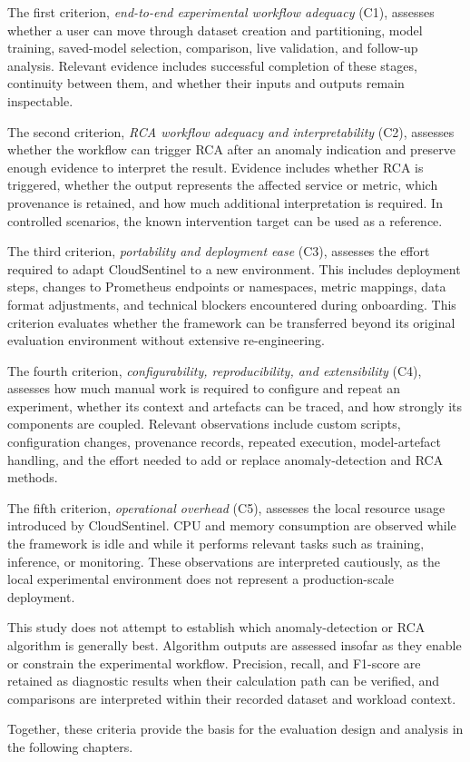 The first criterion, \textit{end-to-end experimental workflow adequacy} (C1), assesses whether a user can move through dataset creation and partitioning, model training, saved-model selection, comparison, live validation, and follow-up analysis. Relevant evidence includes successful completion of these stages, continuity between them, and whether their inputs and outputs remain inspectable.

The second criterion, \textit{RCA workflow adequacy and interpretability} (C2), assesses whether the workflow can trigger RCA after an anomaly indication and preserve enough evidence to interpret the result. Evidence includes whether RCA is triggered, whether the output represents the affected service or metric, which provenance is retained, and how much additional interpretation is required. In controlled scenarios, the known intervention target can be used as a reference.

The third criterion, \textit{portability and deployment ease} (C3), assesses the effort required to adapt CloudSentinel to a new environment. This includes deployment steps, changes to Prometheus endpoints or namespaces, metric mappings, data format adjustments, and technical blockers encountered during onboarding. This criterion evaluates whether the framework can be transferred beyond its original evaluation environment without extensive re-engineering.

The fourth criterion, \textit{configurability, reproducibility, and extensibility} (C4), assesses how much manual work is required to configure and repeat an experiment, whether its context and artefacts can be traced, and how strongly its components are coupled. Relevant observations include custom scripts, configuration changes, provenance records, repeated execution, model-artefact handling, and the effort needed to add or replace anomaly-detection and RCA methods.

The fifth criterion, \textit{operational overhead} (C5), assesses the local resource usage introduced by CloudSentinel. CPU and memory consumption are observed while the framework is idle and while it performs relevant tasks such as training, inference, or monitoring. These observations are interpreted cautiously, as the local experimental environment does not represent a production-scale deployment.

This study does not attempt to establish which anomaly-detection or RCA algorithm is generally best. Algorithm outputs are assessed insofar as they enable or constrain the experimental workflow. Precision, recall, and F1-score are retained as diagnostic results when their calculation path can be verified, and comparisons are interpreted within their recorded dataset and workload context.

Together, these criteria provide the basis for the evaluation design and analysis in the following chapters.
